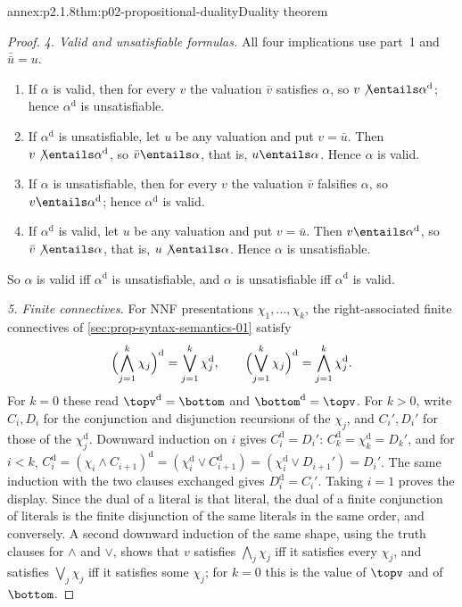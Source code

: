 \begin{annexitem}{annex:p2.1.8}{thm:p02-propositional-duality}{Duality theorem}
\begin{proof}
\emph{4. Valid and unsatisfiable formulas.}  All four implications use part~1
and \(\bar{\bar u}=u\).
\begin{enumerate}
  \item If \(\alpha\) is valid, then for every \(v\) the valuation \(\bar v\)
        satisfies \(\alpha\), so \(v\not\entails\alpha^{\mathrm d}\); hence
        \(\alpha^{\mathrm d}\) is unsatisfiable.
  \item If \(\alpha^{\mathrm d}\) is unsatisfiable, let \(u\) be any valuation
        and put \(v=\bar u\).  Then \(v\not\entails\alpha^{\mathrm d}\), so
        \(\bar v\entails\alpha\), that is, \(u\entails\alpha\).  Hence
        \(\alpha\) is valid.
  \item If \(\alpha\) is unsatisfiable, then for every \(v\) the valuation
        \(\bar v\) falsifies \(\alpha\), so \(v\entails\alpha^{\mathrm d}\);
        hence \(\alpha^{\mathrm d}\) is valid.
  \item If \(\alpha^{\mathrm d}\) is valid, let \(u\) be any valuation and put
        \(v=\bar u\).  Then \(v\entails\alpha^{\mathrm d}\), so
        \(\bar v\not\entails\alpha\), that is, \(u\not\entails\alpha\).  Hence
        \(\alpha\) is unsatisfiable.
\end{enumerate}
So \(\alpha\) is valid iff \(\alpha^{\mathrm d}\) is unsatisfiable, and
\(\alpha\) is unsatisfiable iff \(\alpha^{\mathrm d}\) is valid.

\emph{5. Finite connectives.}  For NNF presentations
\(\chi_1,\ldots,\chi_k\), the right-associated finite connectives of
\cref{sec:prop-syntax-semantics-01} satisfy
\[
 \Bigl(\bigwedge_{j=1}^{k}\chi_j\Bigr)^{\mathrm d}
   =\bigvee_{j=1}^{k}\chi_j^{\mathrm d},
 \qquad
 \Bigl(\bigvee_{j=1}^{k}\chi_j\Bigr)^{\mathrm d}
   =\bigwedge_{j=1}^{k}\chi_j^{\mathrm d}.
\]
For \(k=0\) these read \(\topv^{\mathrm d}=\bottom\) and
\(\bottom^{\mathrm d}=\topv\).  For \(k>0\), write \(C_i,D_i\) for the
conjunction and disjunction recursions of the \(\chi_j\), and \(C_i',D_i'\)
for those of the \(\chi_j^{\mathrm d}\).  Downward induction on \(i\) gives
\(C_i^{\mathrm d}=D_i'\): \(C_k^{\mathrm d}=\chi_k^{\mathrm d}=D_k'\), and for
\(i<k\),
\(C_i^{\mathrm d}=(\chi_i\land C_{i+1})^{\mathrm d}
 =(\chi_i^{\mathrm d}\lor C_{i+1}^{\mathrm d})
 =(\chi_i^{\mathrm d}\lor D_{i+1}')=D_i'\).  The same induction with the two
clauses exchanged gives \(D_i^{\mathrm d}=C_i'\).  Taking \(i=1\) proves the
display.  Since the dual of a literal is that literal, the dual of a finite
conjunction of literals is the finite disjunction of the same literals in the
same order, and conversely.  A second downward induction of the same shape,
using the truth clauses for \(\land\) and \(\lor\), shows that \(v\) satisfies
\(\bigwedge_{j}\chi_j\) iff it satisfies every \(\chi_j\), and satisfies
\(\bigvee_j\chi_j\) iff it satisfies some \(\chi_j\); for \(k=0\) this is the
value of \(\topv\) and of \(\bottom\).


\end{proof}
\end{annexitem}
